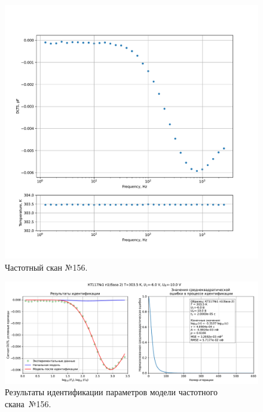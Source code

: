 \begin{figure}[!ht]
    \centering
    \includegraphics[width=1\textwidth]{../plots/КТ117№1_п1(база 2)_2500Гц-1Гц_1пФ_+30С_-6В-10В_100мВ_20мкс_шаг_0,1.pdf}
    \caption{Частотный скан №156.}
    \label{pic:frequency_scan_156}
\end{figure}

\begin{figure}[!ht]
    \centering
    \includegraphics[width=1\textwidth]{../plots/КТ117№1_п1(база 2)_2500Гц-1Гц_1пФ_+30С_-6В-10В_100мВ_20мкс_шаг_0,1_model.pdf}
    \caption{Результаты идентификации параметров модели частотного скана~№156.}
    \label{pic:frequency_scan_model156}
\end{figure}

\pagebreak


